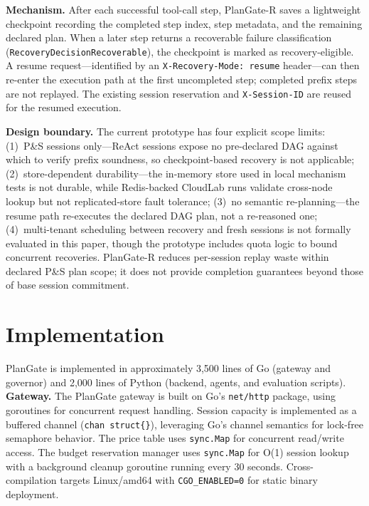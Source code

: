 \documentclass[sigconf,review,anonymous]{acmart}
\begin{document}
\textbf{Mechanism.}
After each successful tool-call step, PlanGate-R saves a lightweight checkpoint recording the completed step index, step metadata, and the remaining declared plan.
When a later step returns a recoverable failure classification (\texttt{RecoveryDecisionRecoverable}), the checkpoint is marked as recovery-eligible.
A resume request---identified by an \texttt{X-Recovery-Mode: resume} header---can then re-enter the execution path at the first uncompleted step; completed prefix steps are not replayed.
The existing session reservation and \texttt{X-Session-ID} are reused for the resumed execution.

\textbf{Design boundary.}
The current prototype has four explicit scope limits:
(1)~P\&S sessions only---ReAct sessions expose no pre-declared DAG against which to verify prefix soundness, so checkpoint-based recovery is not applicable;
(2)~store-dependent durability---the in-memory store used in local mechanism tests is not durable, while Redis-backed CloudLab runs validate cross-node lookup but not replicated-store fault tolerance;
(3)~no semantic re-planning---the resume path re-executes the declared DAG plan, not a re-reasoned one;
(4)~multi-tenant scheduling between recovery and fresh sessions is not formally evaluated in this paper, though the prototype includes quota logic to bound concurrent recoveries.
PlanGate-R reduces per-session replay waste within declared P\&S plan scope; it does not provide completion guarantees beyond those of base session commitment.

\section{Implementation}

PlanGate is implemented in approximately 3,500 lines of Go (gateway and governor) and 2,000 lines of Python (backend, agents, and evaluation scripts).
\textbf{Gateway.} The PlanGate gateway is built on Go's \texttt{net/http} package, using goroutines for concurrent request handling. Session capacity is implemented as a buffered channel (\texttt{chan struct\{\}}), leveraging Go's channel semantics for lock-free semaphore behavior. The price table uses \texttt{sync.Map} for concurrent read/write access. The budget reservation manager uses \texttt{sync.Map} for O(1) session lookup with a background cleanup goroutine running every 30 seconds. Cross-compilation targets Linux/amd64 with \texttt{CGO\_ENABLED=0} for static binary deployment.
\end{document}

